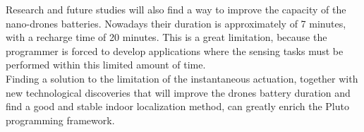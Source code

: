 Research and future studies will also find a way to improve the capacity of the nano-drones batteries. 
Nowadays their duration is approximately of 7 minutes, with a recharge time of 20 minutes.
This is a great limitation, because the programmer is forced to develop applications where the sensing tasks must be performed within this limited amount of time.
\\

Finding a solution to the limitation of the instantaneous actuation, together with new technological discoveries that will improve the drones battery duration and find a good and stable indoor localization method, can greatly enrich the Pluto programming framework.
\\

